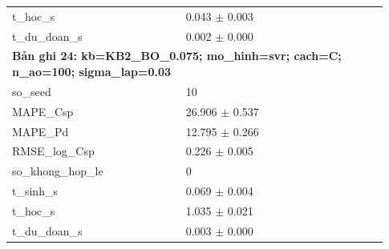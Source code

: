 \begin{longtable}{p{0.43\linewidth}p{0.50\linewidth}}
t\_\allowbreak hoc\_\allowbreak s & 0.043 $\pm$ 0.003 \\
t\_\allowbreak du\_\allowbreak doan\_\allowbreak s & 0.002 $\pm$ 0.000 \\
\midrule
\multicolumn{2}{p{0.95\linewidth}}{\textbf{Bản ghi 24: kb=KB2\_BO\_0.075; mo\_hinh=svr; cach=C; n\_ao=100; sigma\_lap=0.03}} \\
so\_\allowbreak seed & 10 \\
MAPE\_\allowbreak Csp & 26.906 $\pm$ 0.537 \\
MAPE\_\allowbreak Pd & 12.795 $\pm$ 0.266 \\
RMSE\_\allowbreak log\_\allowbreak Csp & 0.226 $\pm$ 0.005 \\
so\_\allowbreak khong\_\allowbreak hop\_\allowbreak le & 0 \\
t\_\allowbreak sinh\_\allowbreak s & 0.069 $\pm$ 0.004 \\
t\_\allowbreak hoc\_\allowbreak s & 1.035 $\pm$ 0.021 \\
t\_\allowbreak du\_\allowbreak doan\_\allowbreak s & 0.003 $\pm$ 0.000 \\
\midrule
\bottomrule
\end{longtable}
